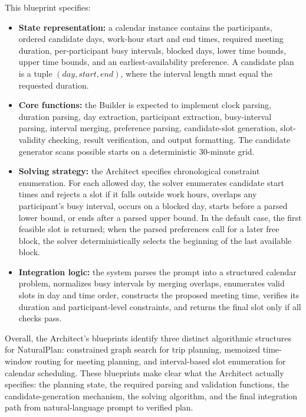 This blueprint specifies:
\begin{itemize}
    \item \textbf{State representation:} a calendar instance contains the
    participants, ordered candidate days, work-hour start and end times,
    required meeting duration, per-participant busy intervals, blocked days,
    lower time bounds, upper time bounds, and an earliest-availability
    preference.  A candidate plan is a tuple \((day, start, end)\), where the
    interval length must equal the requested duration.

    \item \textbf{Core functions:} the Builder is expected to implement clock
    parsing, duration parsing, day extraction, participant extraction,
    busy-interval parsing, interval merging, preference parsing, candidate-slot
    generation, slot-validity checking, result verification, and output
    formatting.  The candidate generator scans possible starts on a
    deterministic 30-minute grid.

    \item \textbf{Solving strategy:} the Architect specifies chronological
    constraint enumeration.  For each allowed day, the solver enumerates
    candidate start times and rejects a slot if it falls outside work hours,
    overlaps any participant's busy interval, occurs on a blocked day, starts
    before a parsed lower bound, or ends after a parsed upper bound.  In the
    default case, the first feasible slot is returned; when the parsed
    preferences call for a later free block, the solver deterministically
    selects the beginning of the last available block.

    \item \textbf{Integration logic:} the system parses the prompt into a
    structured calendar problem, normalizes busy intervals by merging overlaps,
    enumerates valid slots in day and time order, constructs the proposed
    meeting time, verifies its duration and participant-level constraints, and
    returns the final slot only if all checks pass.
\end{itemize}

Overall, the Architect's blueprints identify three distinct algorithmic
structures for NaturalPlan: constrained graph search for trip planning,
memoized time-window routing for meeting planning, and interval-based slot
enumeration for calendar scheduling.  These blueprints make clear what the
Architect actually specifies: the planning state, the required parsing and
validation functions, the candidate-generation mechanism, the solving
algorithm, and the final integration path from natural-language prompt to
verified plan.
